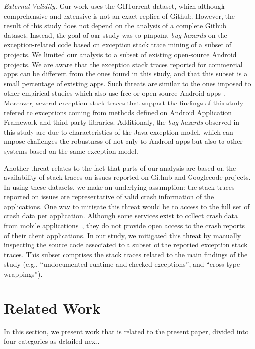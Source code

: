 \emph{External Validity.} Our work uses the GHTorrent dataset, which although 
comprehensive and extensive is not an exact replica of Github. 
However, the result of this study does not depend on the analysis of
a complete Github dataset. Instead, the goal of our study was to 
pinpoint \emph{bug hazards} on the exception-related code based on 
exception stack trace mining of a subset of projects.
We limited our analysis to a subset of existing open-source Android projects.
We are aware that the exception stack traces reported 
for commercial apps can be different from the ones found in this study, and that
this subset is a small percentage of existing apps.
Such threats are similar to the ones imposed to other empirical studies 
which also use free or open-source Android apps~\cite{Linar13,McDon13,Ruiz12}.
Moreover, several exception stack traces that support the findings of this study
refered to exceptions coming from methods defined on Android Application Framework
and third-party libraries.  Additionaly,  the \emph{bug hazards} observed in this study are due to
characteristics of the Java exception model, which can impose challenges 
the robustness of not only to Android apps but also to other systems
 based on the same exception model. 

Another threat relates to the fact that parts of our analysis 
are based on the availability of stack traces on issues reported on Github and Googlecode projects. 
In using these datasets, we make an underlying assumption: the stack traces reported on issues are 
representative of valid crash information of the applications. 
One way to mitigate this threat would be to access to the full 
set of crash data per application. Although some services exist 
to collect crash data from mobile applications~\cite{BugSe14,BugSn14,Googl14,Acra14},
they do not provide open access to the crash reports of their client applications.
In our study, we mitigated this threat by manually inspecting
the source code associated to a subset of the reported exception stack traces.
This subset comprises the stack traces related to the main findings 
of the study (e.g., ``undocumented runtime and checked exceptions'',
and ``cross-type wrappings'').


\section{Related Work}
\label{sec:rele}

In this section, we present work that is related to the present paper, divided into
four categories as detailed next.

